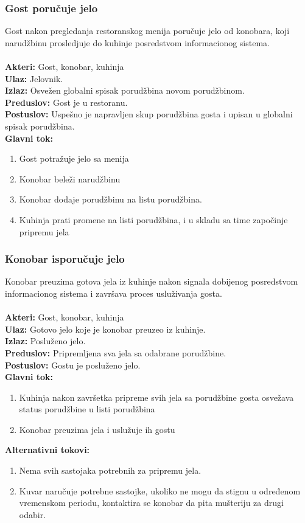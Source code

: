 \documentclass{article}
\begin{document}
\subsubsection{Gost poručuje jelo}
Gost nakon pregledanja restoranskog menija poručuje jelo od konobara, koji narudžbinu prosledjuje do kuhinje posredstvom informacionog sistema.\\\\
\textbf{Akteri:} Gost, konobar, kuhinja\\
\textbf{Ulaz:} Jelovnik.\\
\textbf{Izlaz:} Osvežen globalni spisak porudžbina novom porudžbinom.\\
\textbf{Preduslov:} Gost je u restoranu.\\
\textbf{Postuslov:} Uspešno je napravljen skup porudžbina gosta i upisan u globalni spisak porudžbina.\\
\textbf{Glavni tok:}
\begin{enumerate}
\item Gost potražuje jelo sa menija
\item Konobar beleži narudžbinu 
\item Konobar dodaje porudžbinu na listu porudžbina.
\item Kuhinja prati promene na listi porudžbina, i u skladu sa time započinje pripremu jela \\
\end{enumerate}

\subsubsection{Konobar isporučuje jelo}
Konobar preuzima gotova jela iz kuhinje nakon signala dobijenog posredstvom informacionog sistema i završava proces usluživanja gosta.\\\\
\textbf{Akteri:} Gost, konobar, kuhinja\\
\textbf{Ulaz:} Gotovo jelo koje je konobar preuzeo iz kuhinje.\\
\textbf{Izlaz:} Posluženo jelo.\\
\textbf{Preduslov:} Pripremljena sva jela sa odabrane porudžbine.\\
\textbf{Postuslov:} Gostu je posluženo jelo.\\
\textbf{Glavni tok:}
\begin{enumerate}
\item Kuhinja nakon završetka pripreme svih jela sa porudžbine gosta osvežava status porudžbine u listi porudžbina
\item Konobar preuzima jela i uslužuje ih gostu \\
\end{enumerate}
\textbf{Alternativni tokovi:}
\begin{enumerate}
\item Nema svih sastojaka potrebnih za pripremu jela.
\item Kuvar naručuje potrebne sastojke, ukoliko ne mogu da stignu u određenom vremenskom periodu, kontaktira se konobar da pita mušteriju za drugi odabir. 
\end{enumerate}
\end{document}
